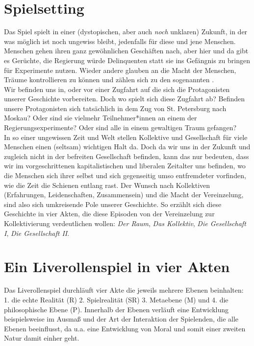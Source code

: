\documentclass[12pt, a4paper, openany]{report}
\begin{document}
\section{Spielsetting}
Das Spiel spielt in einer (dystopischen, aber auch \emph{noch} unklaren) Zukunft, in der was möglich ist noch ungewiss bleibt, jedenfalls für diese und jene Menschen. 
Menschen gehen ihren ganz gewöhnlichen Geschäften nach, aber hier und da gibt es Gerüchte, die Regierung würde Delinquenten statt sie ins Gefängnis zu bringen für Experimente nutzen. 
Wieder andere glauben an die Macht der Menschen, Träume kontrollieren zu können und zählen sich zu den sogenannten .\\
Wir befinden uns in, oder vor einer Zugfahrt auf die sich die Protagonisten unserer Geschichte vorbereiten.
Doch wo spielt sich diese Zugfahrt ab? 
Befinden unsere Protagonisten sich tatsächlich in dem Zug von St. Petersburg nach Moskau? 
Oder sind sie vielmehr Teilnehmer*innen an einem der Regierungsexperimente? 
Oder sind alle in einem gewaltigen Traum gefangen?\\

In so einer ungewissen Zeit und Welt stellen Kollektive und Gesellschaft für viele Menschen einen (seltsam) wichtigen Halt da. 
Doch da wir uns in der Zukunft und zugleich nicht in der befreiten Gesellschaft befinden, kann das nur bedeuten, dass wir im vorgeschrittenen kapitalistischen und liberalen Zeitalter uns befinden, wo die Menschen sich ihrer selbst und sich gegenseitig umso entfremdeter vorfinden, wie die Zeit die Schienen entlang rast.
Der Wunsch nach Kollektiven (Erfahrungen, Leidenschaften, Zusammensein) und die Macht der Vereinzelung, sind also sich umkreisende Pole unserer Geschichte.
So erzählt sich diese Geschichte in vier Akten, die diese Episoden von der Vereinzelung zur Kollektivierung verdeutlichen wollen: \emph{Der Raum}, \emph{Das Kollektiv}, \emph{Die Gesellschaft I}, \emph{Die Gesellschaft II}.

\section{Ein Liverollenspiel in vier Akten}
Das Liverollenspiel durchläuft vier Akte die jeweils mehrere Ebenen beinhalten: 1. die echte Realität (R) 2. Spielrealität (SR) 3. Metaebene (M) und 4. die philosophische Ebene (P). Innerhalb der Ebenen verläuft eine Entwicklung beispielsweise im Ausmaß und der Art der Interaktion der Spielenden, die alle Ebenen beeinflusst, da u.a. eine Entwicklung von Moral und somit einer zweiten Natur damit einher geht.
\end{document}

